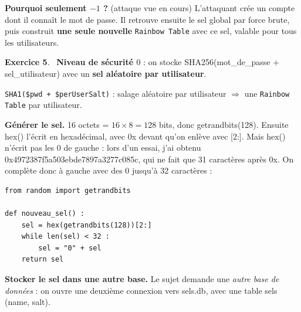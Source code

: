 \documentclass[11pt,a4paper]{article}
\newcommand{\code}[1]{\colorbox{fondcode}{\ttfamily\small #1}}
\newcommand{\exo}[1]{\par\medskip\textbf{Exercice #1}.\ }
\begin{document}
\textbf{Pourquoi seulement $-1$ ?} (attaque vue en cours) L'attaquant crée un compte dont il connaît le mot de passe. Il retrouve ensuite le sel global par force brute, puis construit \textbf{une seule nouvelle} \texttt{Rainbow Table} avec ce sel, valable pour tous les utilisateurs.

\exo{5} \textbf{Niveau de sécurité $0$} : on stocke \code{SHA256(mot\_de\_passe + sel\_utilisateur)} avec un \textbf{sel aléatoire par utilisateur}.

\begin{rappel}[Cours]
\texttt{SHA1(\$pwd + \$perUserSalt)} : salage aléatoire par utilisateur \(\Rightarrow\) une \texttt{Rainbow Table} par utilisateur.
\end{rappel}

\textbf{Générer le sel.} 16 octets = $16 \times 8 = 128$ bits, donc \code{getrandbits(128)}. Ensuite \code{hex()} l'écrit en hexadécimal, avec \code{0x} devant qu'on enlève avec \code{[2:]}. Mais \code{hex()} n'écrit pas les 0 de gauche : lors d'un essai, j'ai obtenu \code{0x4972387f5a503ebde7897a3277c085c}, qui ne fait que 31 caractères après \code{0x}. On complète donc à gauche avec des \code{0} jusqu'à 32 caractères :

\begin{lstlisting}
from random import getrandbits

def nouveau_sel() :
    sel = hex(getrandbits(128))[2:]
    while len(sel) < 32 :
        sel = "0" + sel
    return sel
\end{lstlisting}

\textbf{Stocker le sel dans une autre base.} Le sujet demande une \emph{autre base de données} : on ouvre une deuxième connexion vers \code{sels.db}, avec une table \code{sels (name, salt)}.
\end{document}
